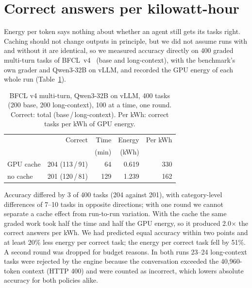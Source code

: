\section{Correct answers per kilowatt-hour}
\label{sec:accuracy}

Energy per token says nothing about whether an agent still gets its tasks right. Caching should not change
outputs in principle, but we did not assume runs with and without it are identical, so we measured accuracy directly on 400 graded multi-turn tasks of BFCL~v4~\cite{bfcl2025} (base and long-context), with the benchmark's own grader and Qwen3-32B on vLLM, and recorded the GPU energy of each whole run
(Table~\ref{tab:bfcl}).

\begin{table}[t]
\centering\small
\caption{BFCL v4 multi-turn, Qwen3-32B on vLLM, 400 tasks (200 base, 200 long-context), 100 at a time, one round. Correct: total (base\,/\,long-context). Per kWh: correct tasks per kWh of GPU energy.}
\label{tab:bfcl}
\begin{tabular}{lrrrr}
\toprule
 & Correct & Time & Energy & Per kWh \\
 & & (min) & (kWh) & \\
\midrule
GPU cache & 204 (113\,/\,91) & 64 & 0.619 & 330 \\
no cache & 201 (120\,/\,81) & 129 & 1.239 & 162 \\
\bottomrule
\end{tabular}
\end{table}

Accuracy differed by 3 of 400 tasks (204 against 201), with category-level differences of 7--10 tasks in opposite
directions; with one round we cannot separate a cache effect from run-to-run variation. With the cache the same graded work took half
the time and half the GPU energy, so it produced 2.0$\times$ the correct answers per kWh. We had predicted equal accuracy
within two points and at least 20\% less energy per correct task; the energy per correct task fell by 51\%. A second
round was dropped for budget reasons. In both runs 23--24 long-context tasks were rejected by the engine because the
conversation exceeded the 40,960-token context (HTTP 400) and were counted as incorrect, which lowers absolute accuracy for both policies alike.
